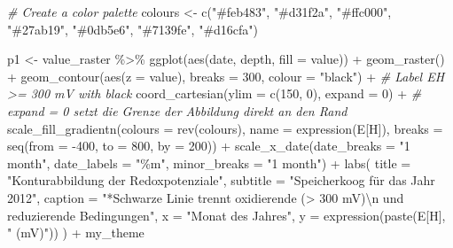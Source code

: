 \documentclass[
]{article}
\newenvironment{Shaded}{\begin{snugshade}}{\end{snugshade}}
\newcommand{\AttributeTok}[1]{\textcolor[rgb]{0.77,0.63,0.00}{#1}}
\newcommand{\CommentTok}[1]{\textcolor[rgb]{0.56,0.35,0.01}{\textit{#1}}}
\newcommand{\DecValTok}[1]{\textcolor[rgb]{0.00,0.00,0.81}{#1}}
\newcommand{\FunctionTok}[1]{\textcolor[rgb]{0.00,0.00,0.00}{#1}}
\newcommand{\NormalTok}[1]{#1}
\newcommand{\OtherTok}[1]{\textcolor[rgb]{0.56,0.35,0.01}{#1}}
\newcommand{\SpecialCharTok}[1]{\textcolor[rgb]{0.00,0.00,0.00}{#1}}
\newcommand{\StringTok}[1]{\textcolor[rgb]{0.31,0.60,0.02}{#1}}
\begin{document}
\begin{Shaded}
\begin{Highlighting}[]
\CommentTok{\# Create a color palette}
\NormalTok{colours }\OtherTok{\textless{}{-}} \FunctionTok{c}\NormalTok{(}\StringTok{"\#feb483"}\NormalTok{, }\StringTok{"\#d31f2a"}\NormalTok{, }\StringTok{"\#ffc000"}\NormalTok{, }\StringTok{"\#27ab19"}\NormalTok{, }\StringTok{"\#0db5e6"}\NormalTok{, }\StringTok{"\#7139fe"}\NormalTok{, }\StringTok{"\#d16cfa"}\NormalTok{)}

\NormalTok{p1 }\OtherTok{\textless{}{-}}\NormalTok{ value\_raster }\SpecialCharTok{\%\textgreater{}\%}
  \FunctionTok{ggplot}\NormalTok{(}\FunctionTok{aes}\NormalTok{(date, depth, }\AttributeTok{fill =}\NormalTok{ value)) }\SpecialCharTok{+}
  \FunctionTok{geom\_raster}\NormalTok{() }\SpecialCharTok{+}
  \FunctionTok{geom\_contour}\NormalTok{(}\FunctionTok{aes}\NormalTok{(}\AttributeTok{z =}\NormalTok{ value), }\AttributeTok{breaks =} \DecValTok{300}\NormalTok{, }\AttributeTok{colour =} \StringTok{"black"}\NormalTok{) }\SpecialCharTok{+} \CommentTok{\# Label EH \textgreater{}= 300 mV with black}
  \FunctionTok{coord\_cartesian}\NormalTok{(}\AttributeTok{ylim =} \FunctionTok{c}\NormalTok{(}\DecValTok{150}\NormalTok{, }\DecValTok{0}\NormalTok{), }\AttributeTok{expand =} \DecValTok{0}\NormalTok{) }\SpecialCharTok{+} \CommentTok{\# expand = 0 setzt die Grenze der Abbildung direkt an den Rand}
  \FunctionTok{scale\_fill\_gradientn}\NormalTok{(}\AttributeTok{colours =} \FunctionTok{rev}\NormalTok{(colours), }
                       \AttributeTok{name =} \FunctionTok{expression}\NormalTok{(E[H]),}
                       \AttributeTok{breaks =} \FunctionTok{seq}\NormalTok{(}\AttributeTok{from =} \SpecialCharTok{{-}}\DecValTok{400}\NormalTok{, }\AttributeTok{to =} \DecValTok{800}\NormalTok{, }\AttributeTok{by =} \DecValTok{200}\NormalTok{)) }\SpecialCharTok{+}
  \FunctionTok{scale\_x\_date}\NormalTok{(}\AttributeTok{date\_breaks =} \StringTok{"1 month"}\NormalTok{, }\AttributeTok{date\_labels =} \StringTok{"\%m"}\NormalTok{, }\AttributeTok{minor\_breaks =} \StringTok{"1 month"}\NormalTok{) }\SpecialCharTok{+}
  \FunctionTok{labs}\NormalTok{(}
    \AttributeTok{title =} \StringTok{"Konturabbildung der Redoxpotenziale"}\NormalTok{,}
    \AttributeTok{subtitle =} \StringTok{"Speicherkoog für das Jahr 2012"}\NormalTok{,}
    \AttributeTok{caption =} \StringTok{"*Schwarze Linie trennt oxidierende (\textgreater{} 300 mV)}\SpecialCharTok{\textbackslash{}n}\StringTok{ und reduzierende Bedingungen"}\NormalTok{,}
    \AttributeTok{x =} \StringTok{"Monat des Jahres"}\NormalTok{,}
    \AttributeTok{y =} \FunctionTok{expression}\NormalTok{(}\FunctionTok{paste}\NormalTok{(E[H], }\StringTok{" (mV)"}\NormalTok{))}
\NormalTok{  ) }\SpecialCharTok{+} 
\NormalTok{  my\_theme}


\end{Highlighting}
\end{Shaded}
\end{document}
